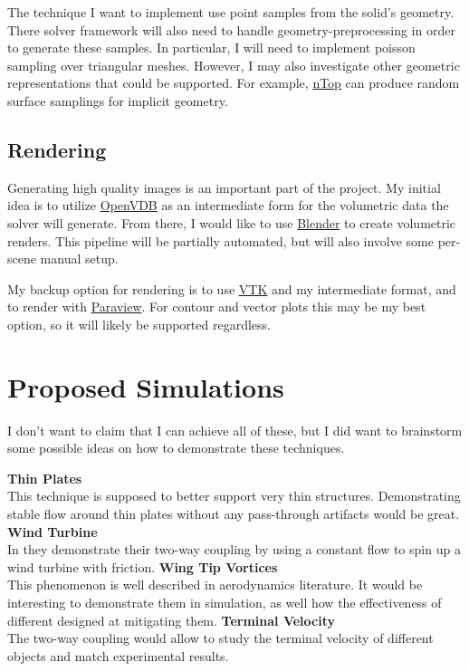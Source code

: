 \documentclass{article}
\begin{document}
The technique I want to implement use point samples from the solid's geometry.
There solver framework will also need to handle geometry-preprocessing in order to generate these samples. 
In particular, I will need to implement poisson sampling over triangular meshes.
However, I may also investigate other geometric representations that could be supported.
For example, \href{https://www.ntop.com}{nTop} can produce random surface samplings
for implicit geometry.

\subsection{Rendering}

Generating high quality images is an important part of the project.
My initial idea is to utilize \href{https://www.openvdb.org}{OpenVDB}
as an intermediate form for the volumetric data the solver will generate.
From there, I would like to use \href{https://www.blender.org}{Blender}
to create volumetric renders.
This pipeline will be partially automated,
but will also involve some per-scene manual setup.

My backup option for rendering is to use \href{https://vtk.org}{VTK} and my intermediate format,
and to render with \href{https://www.paraview.org}{Paraview}.
For contour and vector plots this may be my best option, so it will likely be supported
regardless.

\section{Proposed Simulations}

I don't want to claim that I can achieve all of these, but I did want to brainstorm some possible ideas on how to demonstrate these techniques.
\begin{outline}
  \1 \textbf{Thin Plates} \\
    This technique is supposed to better support very thin structures.
    Demonstrating stable flow around thin plates without any pass-through artifacts would be great.
  \1 \textbf{Wind Turbine} \\
    In \cite{Lyu2021} they demonstrate their two-way coupling by using a constant flow to 
    spin up a wind turbine with friction.
  \1 \textbf{Wing Tip Vortices} \\
    This phenomenon is well described in aerodynamics literature.
    It would be interesting to demonstrate them in simulation, 
    as well how the effectiveness of different designed at mitigating them.
  \1 \textbf{Terminal Velocity} \\
    The two-way coupling would allow to study the terminal velocity of different objects
    and match experimental results.
\end{outline}
\end{document}
